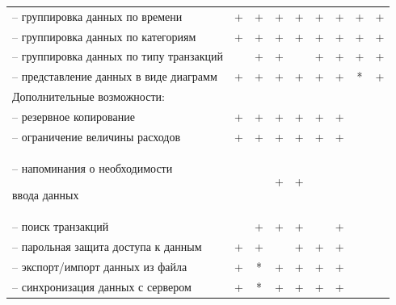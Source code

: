 \begin{table} [h]
{\begin{tabular}{| m{8cm} | c | c | c | c | c | c | c | c |}
      -- группировка данных по времени
      & +
      & +
      & +
      & +
      & +
      & +
      & +
      & + \\

      -- группировка данных по категориям
      & +
      & +
      & +
      & +
      & +
      & +
      & +
      & + \\

      -- группировка данных по типу транзакций
      &
      & +
      & +
      &
      & +
      & +
      & +
      & + \\

      -- представление данных в виде диаграмм
      & +
      & +
      & +
      & +
      & +
      & +
      & *
      & + \\

      \hline

      Дополнительные возможности:
      & & & & & & & & \\

      -- резервное копирование
      & +
      & +
      & +
      & +
      & +
      & +
      &
      & \\

      -- ограничение величины расходов
      & +
      & +
      & +
      & +
      & +
      & +
      &
      & \\

      -- напоминания о необходимости \par
    ввода данных
      &
      &
      & +
      & +
      &
      &
      &
      & \\

      -- поиск транзакций
      &
      & +
      & +
      & +
      &
      & +
      &
      & \\

      -- парольная защита доступа к данным
      & +
      & +
      &
      & +
      & +
      & +
      &
      & \\

      -- экспорт/импорт данных из файла
      & +
      & *
      & +
      & +
      & +
      & +
      &
      & \\

      -- синхронизация данных с сервером
      & +
      & *
      & +
      & +
      & +
      & +
      &
      & \\
      \hline
    \end{tabular}
  }
\end{table}

